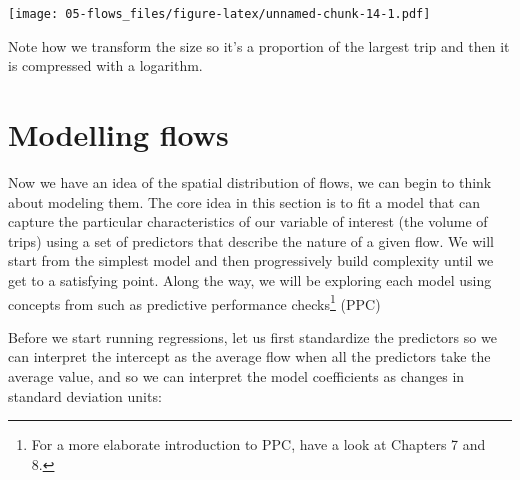 \documentclass[
]{book}
\newenvironment{Shaded}{\begin{snugshade}}{\end{snugshade}}
\newcommand{\CommentTok}[1]{\textcolor[rgb]{0.56,0.35,0.01}{\textit{#1}}}
\newcommand{\FunctionTok}[1]{\textcolor[rgb]{0.00,0.00,0.00}{#1}}
\newcommand{\NormalTok}[1]{#1}
\newcommand{\OtherTok}[1]{\textcolor[rgb]{0.56,0.35,0.01}{#1}}
\newcommand{\SpecialCharTok}[1]{\textcolor[rgb]{0.00,0.00,0.00}{#1}}
\begin{document}
\texttt{[image: 05-flows\_files/figure-latex/unnamed-chunk-14-1.pdf]}

Note how we transform the size so it's a proportion of the largest trip and then it is compressed with a logarithm.

\hypertarget{modelling-flows}{%
\section{Modelling flows}\label{modelling-flows}}

Now we have an idea of the spatial distribution of flows, we can begin to think about modeling them. The core idea in this section is to fit a model that can capture the particular characteristics of our variable of interest (the volume of trips) using a set of predictors that describe the nature of a given flow. We will start from the simplest model and then progressively build complexity until we get to a satisfying point. Along the way, we will be exploring each model using concepts from \citet{gelman2006data} such as predictive performance checks\footnote{For a more elaborate introduction to PPC, have a look at Chapters 7 and 8.} (PPC)

Before we start running regressions, let us first standardize the predictors so we can interpret the intercept as the average flow when all the predictors take the average value, and so we can interpret the model coefficients as changes in standard deviation units:

\begin{Shaded}
\end{Shaded}
\end{document}
